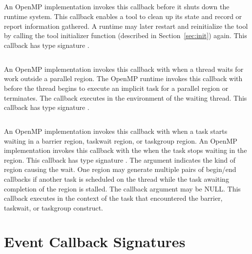 \subsection{}
An OpenMP implementation invokes this callback before it shuts down the
 runtime system.  This callback enables a tool to clean up its
 state and record or report information gathered. A runtime may later restart and reinitialize the tool by
calling the tool initializer
function (described in Section~\ref{sec:init}) again.
 This callback has type signature .

\subsection{}
An OpenMP implementation invokes this callback with  when a thread waits for work outside a parallel region.
  The OpenMP runtime invokes this callback with  before the thread  begins to execute an implicit task for
   a parallel region or terminates. The callback executes in the environment of the waiting thread.
  This callback has type signature .

\subsection{}

  An OpenMP implementation invokes this callback with  when a task starts waiting in a barrier region, taskwait region, or taskgroup region.
   An OpenMP implementation invokes this callback with the  when the task stops waiting in the region.
  This callback has type signature .
   The argument  indicates the kind of region causing the wait.
   One region may generate multiple pairs of begin/end callbacks if another task is scheduled on the thread while the task awaiting completion of the region is stalled.
   The callback argument  may be NULL.
   This callback executes in the context of the task that encountered the barrier, taskwait, or taskgroup construct.


\section{Event Callback Signatures}
\label{sec:ToolsSupport_callback_signatures}

